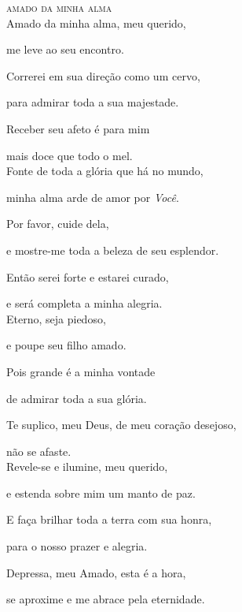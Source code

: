 \vspace*{1cm}

\textsc{amado da minha alma}\\[15pt]

Amado da minha alma, meu querido,

me leve ao seu encontro.

Correrei em sua direção como um cervo,

para admirar toda a sua majestade.

Receber seu afeto é para mim

mais doce que todo o mel.\\[10pt]

Fonte de toda a glória que há no mundo,

minha alma arde de amor por \emph{Você}.

Por favor, cuide dela,

e mostre-me toda a beleza de seu esplendor.

Então serei forte e estarei curado,

e será completa a minha alegria.\\[10pt]

Eterno, seja piedoso,

e poupe seu filho amado.

Pois grande é a minha vontade

de admirar toda a sua glória.

Te suplico, meu Deus, de meu coração desejoso,

não se afaste.\\[10pt]

Revele-se e ilumine, meu querido,

e estenda sobre mim um manto de paz.

E faça brilhar toda a terra com sua honra,

para o nosso prazer e alegria.

Depressa, meu Amado, esta é a hora,

se aproxime e me abrace pela eternidade.

%


%



\movetoevenpage
\raggedleft
{}

